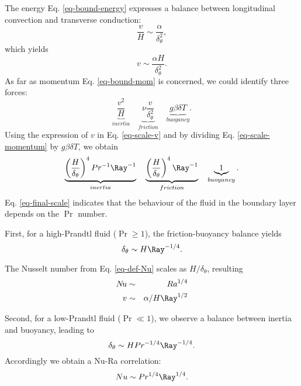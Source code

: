 The energy Eq. \ref{eq-bound-energy} expresses a balance between longitudinal convection and transverse conduction:
\begin{equation}
	\frac{v}{H} \sim \frac{\alpha}{\delta_\theta^2},
\end{equation}
which yields
\begin{equation} \label{eq-scale-v}
	v \sim \frac{\alpha H}{\delta_\theta^2}.
\end{equation}
As far as momentum Eq. \ref{eq-bound-mom} is concerned, we could identify three forces:
\begin{equation} \label{eq-scale-momentum}
	\underbrace{\frac{v^2}{H}}_{inertia} \quad \underbrace{\nu \frac{v}{\delta_\theta^2}}_{friction} \quad \underbrace{g \beta \delta T}_{buoyancy}.
\end{equation}
Using the expression of $v$ in Eq. \ref{eq-scale-v} and by dividing Eq. \ref{eq-scale-momentum} by $g \beta \delta T$, we obtain
\begin{equation} \label{eq-final-scale}
	\underbrace{\left( \frac{H}{\delta_\theta} \right)^4 Pr ^{-1} \Ray^{-1}}_{inertia} \quad  \underbrace{\left( \frac{H}{\delta_\theta} \right)^4 \Ray^{-1}}_{friction} \quad \underbrace{1}_{buoyancy}.
\end{equation}
Eq. \ref{eq-final-scale} indicates that the behaviour of the fluid in the boundary layer depends on the $\Pr$ number.

\noindent First, for a high-Prandtl fluid ($\Pr \geq 1$), the friction-buoyancy balance yields
\begin{equation} \label{eq-scale-nbd-high-Pr}
	\delta_\theta \sim H \Ray^{-1/4}.
\end{equation}

\noindent The Nusselt number from Eq. \ref{eq-def-Nu} scales as $H/\delta_\theta$, resulting
\begin{eqnarray} 
	N\!u & \sim & Ra^{1/4} \\
	v & \sim & \alpha/H \Ray^{1/2}
\end{eqnarray}

\noindent Second, for a low-Prandtl fluid ($\Pr \ll 1$), we observe a balance between inertia and buoyancy, leading to
\begin{equation} \label{eq-corr-Low-Pr}
	\delta_\theta \sim H Pr^{-1/4} \Ray^{-1/4}.
\end{equation}
Accordingly we obtain a Nu-Ra correlation:
\begin{equation}
	Nu \sim Pr^{1/4} \Ray^{1/4}.
\end{equation}

%
%
%
%
%
%

